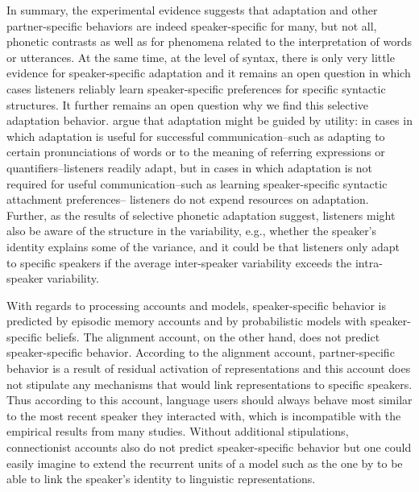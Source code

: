 In summary, the experimental evidence suggests that adaptation and other partner-specific behaviors are indeed speaker-specific for many, but not all, phonetic contrasts as
well as for phenomena related to the interpretation of words or utterances. At the same time, at the level of syntax, there is only very little evidence for speaker-specific
adaptation and it remains an open question  in which cases listeners reliably learn speaker-specific preferences for specific syntactic structures. 
It further remains an open question why we find this selective adaptation behavior. \cite{OstrandFerreira2019}
argue that adaptation might be guided by utility: in cases in which adaptation is useful for successful communication--such as adapting to certain pronunciations of words or to the meaning
of referring expressions or quantifiers--listeners readily adapt, but in cases in which adaptation is not required for useful communication--such as learning speaker-specific syntactic attachment preferences--
listeners do not expend resources on adaptation. Further, as the results of selective phonetic adaptation suggest, listeners might also be aware of the structure in the variability, e.g., whether the speaker's
identity explains some of the variance, and it could be that listeners only adapt to specific speakers if the average inter-speaker variability exceeds the intra-speaker variability.

With regards to processing accounts and models, speaker-specific behavior is predicted by episodic memory accounts and by probabilistic models with speaker-specific beliefs. 
The alignment account, on the other hand, does not predict speaker-specific behavior. According to the alignment account, partner-specific behavior is a result of residual activation of representations
and this account does not stipulate any mechanisms that would link representations to specific speakers. Thus according to this account, language users should always behave most similar to 
the most recent speaker they interacted with, which is incompatible with the empirical results from many studies. Without additional stipulations, connectionist accounts also do not 
predict speaker-specific behavior but one could easily imagine to extend the recurrent units of a model such as the one by \cite{Cheng2006} to be able to link the speaker's identity to
linguistic representations.

